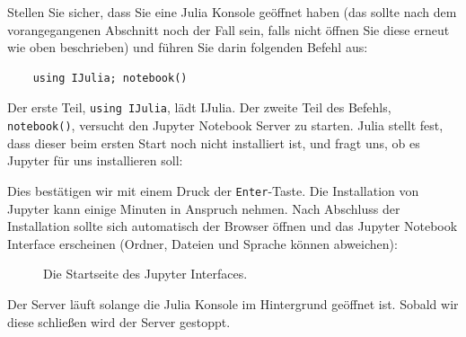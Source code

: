 \documentclass[11pt, a4paper]{scrartcl}
\begin{document}
	Stellen Sie sicher, dass Sie eine Julia Konsole geöffnet haben (das sollte nach dem vorangegangenen Abschnitt noch der Fall sein, falls nicht öffnen Sie diese erneut wie oben beschrieben) und führen Sie darin folgenden Befehl aus:
	
	\begin{lstlisting}
	using IJulia; notebook()
	\end{lstlisting}
	
	Der erste Teil, \texttt{using IJulia}, lädt IJulia. Der zweite Teil des Befehls, \texttt{notebook()}, versucht den Jupyter Notebook Server zu starten. Julia stellt fest, dass dieser beim ersten Start noch nicht installiert ist, und fragt uns, ob es Jupyter für uns installieren soll:
	
	\begin{figure}[h!]
	\centering
	\end{figure}
	
	Dies bestätigen wir mit einem Druck der \texttt{Enter}-Taste. Die Installation von Jupyter kann einige Minuten in Anspruch nehmen. Nach Abschluss der Installation sollte sich automatisch der Browser öffnen und das Jupyter Notebook Interface erscheinen (Ordner, Dateien und Sprache können abweichen):
	
	\begin{figure}[h!]
	\centering
	\caption{Die Startseite des Jupyter Interfaces. \label{fig:jupyter}}
	\end{figure}
	
	Der Server läuft solange die Julia Konsole im Hintergrund geöffnet ist. Sobald wir diese schließen wird der Server gestoppt.
	
\end{document}
